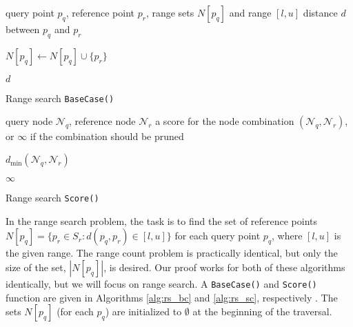 \begin{algorithm}[tb]
\begin{algorithmic}[1]
     query point $p_q$, reference point $p_r$, range
sets $N[p_q]$ and range $[l, u]$
     distance $d$ between $p_q$ and $p_r$


    \STATE  $N[p_q] \gets N[p_q] \cup \{ p_r \}$
    \ENDIF

    \RETURN $d$
  \end{algorithmic}
  \caption{Range search \texttt{BaseCase()}}
  \label{alg:rs_bc}
\end{algorithm}

\begin{algorithm}[tb]
  \begin{algorithmic}[1]
     query node $\mathscr{N}_q$, reference node
$\mathscr{N}_r$
     a score for the node combination $(\mathscr{N}_q,
\mathscr{N}_r)$, or $\infty$ if the combination should be pruned

    \medskip

      \RETURN $d_{\min}(\mathscr{N}_q, \mathscr{N}_r)$
    \ENDIF

    \RETURN $\infty$
  \end{algorithmic}
  \caption{Range search \texttt{Score()}}
  \label{alg:rs_sc}
\end{algorithm}

In the range search problem, the task is to find the set of reference points
$N[p_q] = \{ p_r \in S_r : d(p_q, p_r) \in [l, u] \}$
for each query point $p_q$, where $[l, u]$ is the given
range.  The range count problem is practically identical, but only the size of
the set, $|N[p_q]|$, is desired.
Our proof works for both of these algorithms
identically, but we will focus on range search.  A \texttt{BaseCase()} and
\texttt{Score()} function are given in Algorithms \ref{alg:rs_bc} and
\ref{alg:rs_sc}, respectively \citep[a correctness proof can be found
in][]{curtin2013tree}.  The sets $N[p_q]$ (for each $p_q$) are
initialized to $\emptyset$ at the beginning of the traversal.

